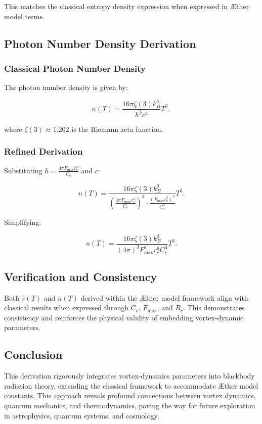   This matches the classical entropy density expression when expressed in Æther model terms.

  \subsection*{Photon Number Density Derivation}

  \subsubsection*{Classical Photon Number Density}
  The photon number density is given by:

  \begin{equation*}
   n(T) = \frac{16 \pi \zeta(3) k_B^3}{h^3 c^3} T^3,
  \end{equation*}

  where $\zeta(3) \approx 1.202$ is the Riemann zeta function.

  \subsubsection*{Refined Derivation}
  Substituting $h = \frac{4 \pi F_{\max} r_c^2}{C_e}$ and $c$:

  \begin{equation*}
   n(T) = \frac{16 \pi \zeta(3) k_B^3}{\left(\frac{4 \pi F_{\max} r_c^2}{C_e}\right)^3 \cdot \frac{(F_{\max} r_c^2)^3}{C_e^3}} T^3.
  \end{equation*}

  Simplifying:

  \begin{equation*}
   n(T) = \frac{16 \pi \zeta(3) k_B^3}{(4 \pi)^3 F_{\max}^3 r_c^6 C_e^3} T^3.
  \end{equation*}

  \subsection*{Verification and Consistency}
  Both $s(T)$ and $n(T)$ derived within the Æther model framework align with classical results when expressed through $C_e$, $F_{\max}$, and $R_c$. This demonstrates consistency and reinforces the physical validity of embedding vortex-dynamic parameters.

  \subsection*{Conclusion}
  This derivation rigorously integrates vortex-dynamics parameters into blackbody radiation theory, extending the classical framework to accommodate Æther model constants. This approach reveals profound connections between vortex dynamics, quantum mechanics, and thermodynamics, paving the way for future exploration in astrophysics, quantum systems, and cosmology.